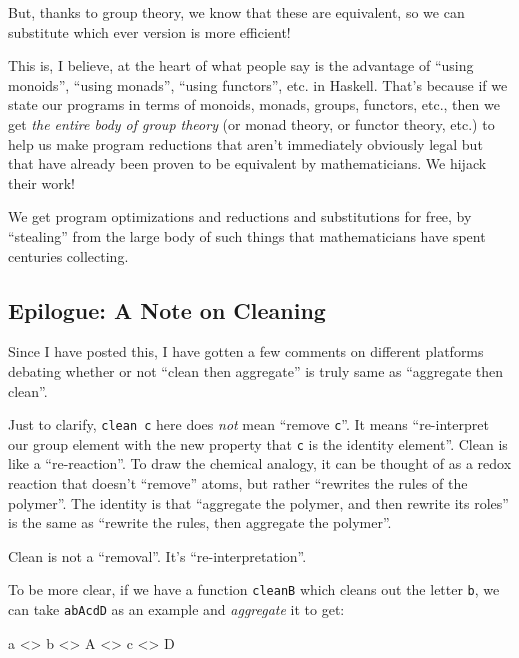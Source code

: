 \documentclass[]{article}
\newenvironment{Shaded}{}{}
\newcommand{\DataTypeTok}[1]{\textcolor[rgb]{0.56,0.13,0.00}{#1}}
\newcommand{\NormalTok}[1]{#1}
\newcommand{\OperatorTok}[1]{\textcolor[rgb]{0.40,0.40,0.40}{#1}}
\begin{document}
But, thanks to group theory, we know that these are equivalent, so we can
substitute which ever version is more efficient!

This is, I believe, at the heart of what people say is the advantage of ``using
monoids'', ``using monads'', ``using functors'', etc. in Haskell. That's because
if we state our programs in terms of monoids, monads, groups, functors, etc.,
then we get \emph{the entire body of group theory} (or monad theory, or functor
theory, etc.) to help us make program reductions that aren't immediately
obviously legal but that have already been proven to be equivalent by
mathematicians. We hijack their work!

We get program optimizations and reductions and substitutions for free, by
``stealing'' from the large body of such things that mathematicians have spent
centuries collecting.

\subsection{Epilogue: A Note on Cleaning}\label{epilogue-a-note-on-cleaning}

Since I have posted this, I have gotten a few comments on different platforms
debating whether or not ``clean then aggregate'' is truly same as ``aggregate
then clean''.

Just to clarify, \texttt{clean\ c} here does \emph{not} mean ``remove
\texttt{c}''. It means ``re-interpret our group element with the new property
that \texttt{c} is the identity element''. Clean is like a ``re-reaction''. To
draw the chemical analogy, it can be thought of as a redox reaction that doesn't
``remove'' atoms, but rather ``rewrites the rules of the polymer''. The identity
is that ``aggregate the polymer, and then rewrite its roles'' is the same as
``rewrite the rules, then aggregate the polymer''.

Clean is not a ``removal''. It's ``re-interpretation''.

To be more clear, if we have a function \texttt{cleanB} which cleans out the
letter \texttt{b}, we can take \texttt{abAcdD} as an example and
\emph{aggregate} it to get:

\begin{Shaded}
\begin{Highlighting}[]
\NormalTok{a }\OperatorTok{\textless{}\textgreater{}}\NormalTok{ b }\OperatorTok{\textless{}\textgreater{}} \DataTypeTok{A} \OperatorTok{\textless{}\textgreater{}}\NormalTok{ c }\OperatorTok{\textless{}\textgreater{}} \DataTypeTok{D}
\end{Highlighting}
\end{Shaded}
\end{document}
